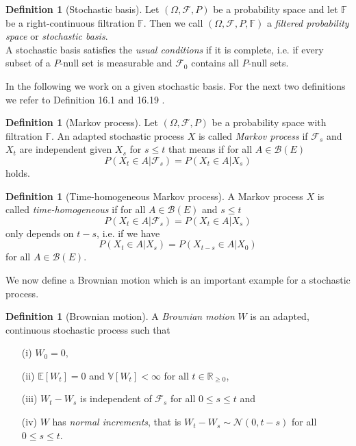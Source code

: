 \documentclass[11pt,titlepage]{article}
\newcommand{\R}{\mathbb{R}} %
\newcommand{\E}{\mathbb{E}} %
\newcommand{\V}{\mathbb{V}} %
\theoremstyle{definition}
\newtheorem{definition}[theorem]{Definition}
\theoremstyle{remark}
\begin{document}
	\begin{definition}[Stochastic basis]
		Let $(\Omega, \mathcal{F}, P)$ be a probability space and let $\mathbb{F}$ be a right-continuous filtration 
		$\mathbb{F}$. Then we call $(\Omega, \mathcal{F}, P, \mathbb{F})$ a \textsl{filtered probability space} or \textsl{stochastic basis}.\\
		A stochastic basis satisfies the \textsl{usual conditions} if it is complete, i.e. 
		if every subset of a $P$-null set is measurable and $\mathcal{F}_0$ contains all $P$-null sets.
	\end{definition}
	
	In the following we work on a given stochastic basis. For the next two definitions we refer to Definition 16.1 and 16.19 \cite{Pfaffelhuber2020}.
	
	\begin{definition}[Markov process]
		Let $(\Omega, \mathcal{F}, P)$ be a probability space with filtration $\mathbb{F}$. An adapted stochastic process $X$ is called \textsl{Markov process} if 
		$\mathcal{F}_s$ and $X_t$ are independent given $X_s$ for $s\leq t$ that means if for all $A\in\mathcal{B}(E)$ 
		\[P(X_t\in A \vert \mathcal{F}_s)=P(X_t\in A\vert X_s)\]
		holds.
	\end{definition}
	
	\begin{definition}[Time-homogeneous Markov process]\label{Def time homog}
		A Markov process $X$ is called \textsl{time-homogeneous} if for all $A\in\mathcal{B}(E)$ 
		and $s \leq t$
		\[P(X_t\in A \vert \mathcal{F}_s)=P(X_t\in A\vert X_s)\]
		only depends on $t-s$, i.e. if we have
		\[P(X_t \in A\vert X_s) = P(X_{t-s}\in A\vert X_0)\]
		for all $A\in\mathcal{B}(E)$.
	\end{definition}
	
	We now define a Brownian motion which is an important example for a stochastic process. 
	
	\begin{definition}[Brownian motion]\label{Def brownian motion}
		A \textsl{Brownian motion} $W$ is an adapted, continuous stochastic process such that
		\begin{itemize}
			\item[(i)] $W_0 = 0,$
			\item[(ii)] $\E[W_t]=0$ and $\V[W_t]<\infty$ for all $t\in\R_{\geq 0}$,
			\item[(iii)] $W_t - W_s$ is independent of $\mathcal{F}_s$ for all $0\leq s\leq t$ and
			\item[(iv)] $W$ has \textsl{normal increments}, that is $W_t-W_s\sim\mathcal{N}(0, t-s)$ for all $0\leq s\leq t$.
		\end{itemize}
	\end{definition}
\end{document}
